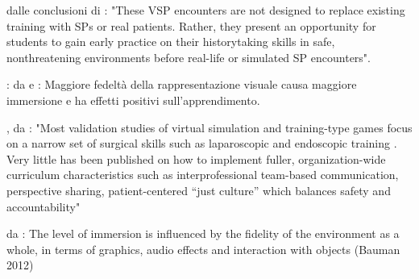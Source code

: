 dalle conclusioni di \cite{maicher2017developing}: "These VSP encounters are not designed to replace existing training with SPs or real patients. Rather, they present an opportunity for students to gain early practice on their historytaking skills in safe, nonthreatening environments before real-life or simulated SP encounters".\par

: da \cite{coulter2007effect} e \cite{huerta2012measuring}: Maggiore fedeltà della rappresentazione visuale causa maggiore immersione e ha effetti positivi sull'apprendimento.

, da \cite{zielke2015serious}: "Most validation studies of virtual simulation and training-type games focus on a narrow set of surgical skills such as laparoscopic and endoscopic training \cite{graafland2012systematic}. Very little has been published on how to implement fuller, organization-wide curriculum characteristics such as interprofessional team-based communication, perspective sharing, patient-centered “just culture” which balances safety and accountability"

 da \cite{}: The level of immersion is influenced by the fidelity of the environment as a whole, in terms of graphics, audio effects and interaction with objects (Bauman 2012)


